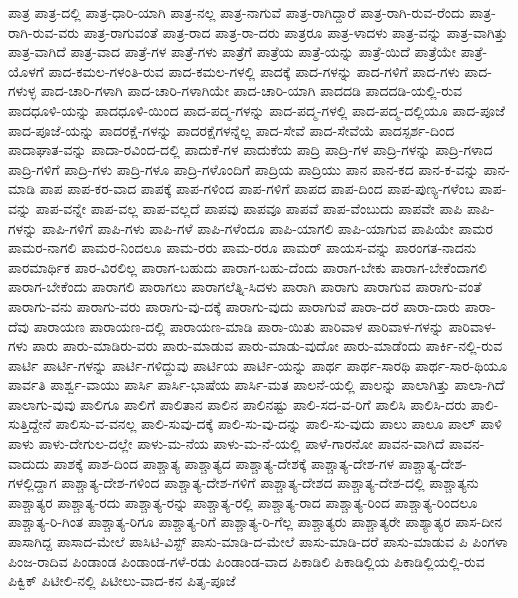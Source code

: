 {ಪಾತ್ರ
ಪಾತ್ರ-ದಲ್ಲಿ
ಪಾತ್ರ-ಧಾರಿ-ಯಾಗಿ
ಪಾತ್ರ-ನಲ್ಲ
ಪಾತ್ರ-ನಾಗುವೆ
ಪಾತ್ರ-ರಾಗಿದ್ದಾರೆ
ಪಾತ್ರ-ರಾಗಿ-ರುವ-ರೆಂದು
ಪಾತ್ರ-ರಾಗಿ-ರುವ-ವರು
ಪಾತ್ರ-ರಾಗುವಂತೆ
ಪಾತ್ರ-ರಾದ
ಪಾತ್ರ-ರಾ-ದರು
ಪಾತ್ರರೂ
ಪಾತ್ರ-ಳಾದಳು
ಪಾತ್ರ-ವನ್ನು
ಪಾತ್ರ-ವಾಗಿತ್ತು
ಪಾತ್ರ-ವಾಗಿದೆ
ಪಾತ್ರ-ವಾದ
ಪಾತ್ರೆ-ಗಳ
ಪಾತ್ರೆ-ಗಳು
ಪಾತ್ರೆಗೆ
ಪಾತ್ರೆಯ
ಪಾತ್ರೆ-ಯನ್ನು
ಪಾತ್ರೆ-ಯಿದೆ
ಪಾತ್ರೆಯೇ
ಪಾತ್ರೆ-ಯೊಳಗೆ
ಪಾದ-ಕಮಲ-ಗಳಂತಿ-ರುವ
ಪಾದ-ಕಮಲ-ಗಳಲ್ಲಿ
ಪಾದಕ್ಕೆ
ಪಾದ-ಗಳನ್ನು
ಪಾದ-ಗಳಿಗೆ
ಪಾದ-ಗಳು
ಪಾದ-ಗಳುಳ್ಳ
ಪಾದ-ಚಾರಿ-ಗಳಾಗಿ
ಪಾದ-ಚಾರಿ-ಗಳಾಗಿಯೇ
ಪಾದ-ಚಾರಿ-ಯಾಗಿ
ಪಾದದಡಿ
ಪಾದದಡಿ-ಯಲ್ಲಿ-ರುವ
ಪಾದಧೂಳಿ-ಯನ್ನು
ಪಾದಧೂಳಿ-ಯಿಂದ
ಪಾದ-ಪದ್ಮ-ಗಳನ್ನು
ಪಾದ-ಪದ್ಮ-ಗಳಲ್ಲಿ
ಪಾದ-ಪದ್ಮ-ದಲ್ಲಿಯೂ
ಪಾದ-ಪೂಜೆ
ಪಾದ-ಪೂಜೆ-ಯನ್ನು
ಪಾದರಕ್ಷೆ-ಗಳನ್ನು
ಪಾದರಕ್ಷೆಗಳನ್ನೆಲ್ಲ
ಪಾದ-ಸೇವೆ
ಪಾದ-ಸೇವೆಯೆ
ಪಾದಸ್ಪರ್ಶ-ದಿಂದ
ಪಾದಾಘಾತ-ವನ್ನು
ಪಾದಾ-ರವಿಂದ-ದಲ್ಲಿ
ಪಾದುಕೆ-ಗಳ
ಪಾದುಕೆಯ
ಪಾದ್ರಿ
ಪಾದ್ರಿ-ಗಳ
ಪಾದ್ರಿ-ಗಳನ್ನು
ಪಾದ್ರಿ-ಗಳಾದ
ಪಾದ್ರಿ-ಗಳಿಗೆ
ಪಾದ್ರಿ-ಗಳು
ಪಾದ್ರಿ-ಗಳೂ
ಪಾದ್ರಿ-ಗಳೊಂದಿಗೆ
ಪಾದ್ರಿಯ
ಪಾದ್ರಿಯು
ಪಾನ
ಪಾನ-ಕದ
ಪಾನ-ಕ-ವನ್ನು
ಪಾನ-ಮಾಡಿ
ಪಾಪ
ಪಾಪ-ಕರ-ವಾದ
ಪಾಪಕ್ಕೆ
ಪಾಪ-ಗಳಿಂದ
ಪಾಪ-ಗಳಿಗೆ
ಪಾಪದ
ಪಾಪ-ದಿಂದ
ಪಾಪ-ಪುಣ್ಯ-ಗಳೆಂಬ
ಪಾಪ-ವನ್ನು
ಪಾಪ-ವನ್ನೇ
ಪಾಪ-ವಲ್ಲ
ಪಾಪ-ವಲ್ಲದೆ
ಪಾಪವು
ಪಾಪವೂ
ಪಾಪವೆ
ಪಾಪ-ವೆಂಬುದು
ಪಾಪವೇ
ಪಾಪಿ
ಪಾಪಿ-ಗಳನ್ನು
ಪಾಪಿ-ಗಳಿಗೆ
ಪಾಪಿ-ಗಳು
ಪಾಪಿ-ಗಳೆ
ಪಾಪಿ-ಗಳೆಂದೂ
ಪಾಪಿ-ಯಾಗಲಿ
ಪಾಪಿ-ಯಾಗುವ
ಪಾಪಿಯೇ
ಪಾಮರ
ಪಾಮರ-ನಾಗಲಿ
ಪಾಮರ-ನಿಂದಲೂ
ಪಾಮ-ರರು
ಪಾಮ-ರರೂ
ಪಾಮರ್
ಪಾಯಸ-ವನ್ನು
ಪಾರಂಗತ-ನಾದನು
ಪಾರಮಾರ್ಥಿಕ
ಪಾರ-ವಿರಲಿಲ್ಲ
ಪಾರಾಗ-ಬಹುದು
ಪಾರಾಗ-ಬಹು-ದೆಂದು
ಪಾರಾಗ-ಬೇಕು
ಪಾರಾಗ-ಬೇಕೆಂದಾಗಲಿ
ಪಾರಾಗ-ಬೇಕೆಂದು
ಪಾರಾಗಲಿ
ಪಾರಾಗಲು
ಪಾರಾಗಲೆತ್ನಿ-ಸಿದಳು
ಪಾರಾಗಿ
ಪಾರಾಗು
ಪಾರಾಗುವ
ಪಾರಾಗು-ವಂತೆ
ಪಾರಾಗು-ವನು
ಪಾರಾಗು-ವರು
ಪಾರಾಗು-ವು-ದಕ್ಕೆ
ಪಾರಾಗು-ವುದು
ಪಾರಾಗುವೆ
ಪಾರಾ-ದರೆ
ಪಾರಾ-ದಾರು
ಪಾರಾ-ದೆವು
ಪಾರಾಯಣ
ಪಾರಾಯಣ-ದಲ್ಲಿ
ಪಾರಾಯಣ-ಮಾಡಿ
ಪಾರಾ-ಯಿತು
ಪಾರಿವಾಳ
ಪಾರಿವಾಳ-ಗಳನ್ನು
ಪಾರಿವಾಳ-ಗಳು
ಪಾರು
ಪಾರು-ಮಾಡಿರು-ವರು
ಪಾರು-ಮಾಡುವ
ಪಾರು-ಮಾಡು-ವುದೋ
ಪಾರು-ಮಾಡೆಂದು
ಪಾರ್ಕಿ-ನಲ್ಲಿ-ರುವ
ಪಾರ್ಟಿ
ಪಾರ್ಟಿ-ಗಳನ್ನು
ಪಾರ್ಟಿ-ಗಳಿದ್ದುವು
ಪಾರ್ಟಿಯ
ಪಾರ್ಟಿ-ಯನ್ನು
ಪಾರ್ಥ
ಪಾರ್ಥ-ಸಾರಥಿ
ಪಾರ್ಥ-ಸಾರ-ಥಿಯೂ
ಪಾರ್ವತಿ
ಪಾರ್ಶ್ವ-ವಾಯು
ಪಾರ್ಸಿ
ಪಾರ್ಸಿ-ಭಾಷೆಯ
ಪಾರ್ಸಿ-ಮತ
ಪಾಲನೆ-ಯಲ್ಲಿ
ಪಾಲನ್ನು
ಪಾಲಾಗಿತ್ತು
ಪಾಲಾ-ಗಿದೆ
ಪಾಲಾಗು-ವುವು
ಪಾಲಿಗೂ
ಪಾಲಿಗೆ
ಪಾಲಿತಾನ
ಪಾಲಿನ
ಪಾಲಿನಷ್ಟು
ಪಾಲಿ-ಸದ-ವ-ರಿಗೆ
ಪಾಲಿಸಿ
ಪಾಲಿಸಿ-ದರು
ಪಾಲಿ-ಸುತ್ತಿದ್ದೇನೆ
ಪಾಲಿಸು-ವ-ವನಲ್ಲ
ಪಾಲಿ-ಸುವು-ದಕ್ಕೆ
ಪಾಲಿ-ಸು-ವು-ದನ್ನು
ಪಾಲಿ-ಸು-ವುದು
ಪಾಲು
ಪಾಲೂ
ಪಾಲ್
ಪಾಳಿ
ಪಾಳು
ಪಾಳು-ದೇಗುಲ-ದಲ್ಲೇ
ಪಾಳು-ಮ-ನೆಯ
ಪಾಳು-ಮ-ನೆ-ಯಲ್ಲಿ
ಪಾಳೆ-ಗಾರನೋ
ಪಾವನ-ವಾಗಿದೆ
ಪಾವನ-ವಾದುದು
ಪಾಶಕ್ಕೆ
ಪಾಶ-ದಿಂದ
ಪಾಶ್ಚಾತ್ಯ
ಪಾಶ್ಚಾತ್ಯದ
ಪಾಶ್ಚಾತ್ಯ-ದೇಶಕ್ಕೆ
ಪಾಶ್ಚಾತ್ಯ-ದೇಶ-ಗಳ
ಪಾಶ್ಚಾತ್ಯ-ದೇಶ-ಗಳಲ್ಲಿದ್ದಾಗ
ಪಾಶ್ಚಾತ್ಯ-ದೇಶ-ಗಳಿಂದ
ಪಾಶ್ಚಾತ್ಯ-ದೇಶ-ಗಳಿಗೆ
ಪಾಶ್ಚಾತ್ಯ-ದೇಶದ
ಪಾಶ್ಚಾತ್ಯ-ದೇಶ-ದಲ್ಲಿ
ಪಾಶ್ಚಾತ್ಯನು
ಪಾಶ್ಚಾತ್ಯರ
ಪಾಶ್ಚಾತ್ಯ-ರದು
ಪಾಶ್ಚಾತ್ಯ-ರನ್ನು
ಪಾಶ್ಚಾತ್ಯ-ರಲ್ಲಿ
ಪಾಶ್ಚಾತ್ಯ-ರಾದ
ಪಾಶ್ಚಾತ್ಯ-ರಿಂದ
ಪಾಶ್ಚಾತ್ಯ-ರಿಂದಲೂ
ಪಾಶ್ಚಾತ್ಯ-ರಿ-ಗಿಂತ
ಪಾಶ್ಚಾತ್ಯ-ರಿಗೂ
ಪಾಶ್ಚಾತ್ಯ-ರಿಗೆ
ಪಾಶ್ಚಾತ್ಯ-ರಿ-ಗೆಲ್ಲ
ಪಾಶ್ಚಾತ್ಯರು
ಪಾಶ್ಚಾತ್ಯರೇ
ಪಾಶ್ಯಾತ್ಯರ
ಪಾಸ-ದೀನ
ಪಾಸಾಗಿದ್ದ
ಪಾಸಾದ-ಮೇಲೆ
ಪಾಸಿಟಿ-ವಿಸ್ಟ್
ಪಾಸು-ಮಾಡಿ-ದ-ಮೇಲೆ
ಪಾಸು-ಮಾಡಿ-ದರೆ
ಪಾಸು-ಮಾಡುವ
ಪಿ
ಪಿಂಗಳಾ
ಪಿಂಜ-ರಾದಿವ
ಪಿಂಡಾಂಡ
ಪಿಂಡಾಂಡ-ಗಳೆ-ರಡು
ಪಿಂಡಾಂಡ-ವಾದ
ಪಿಕಾಡಿಲಿ
ಪಿಕಾಡಿಲ್ಲಿಯ
ಪಿಕಾಡಿಲ್ಲಿಯಲ್ಲಿ-ರುವ
ಪಿಕ್ವಿಕ್
ಪಿಟೀಲಿ-ನಲ್ಲಿ
ಪಿಟೀಲು-ವಾದ-ಕನ
ಪಿತೃ-ಪೂಜೆ
}
